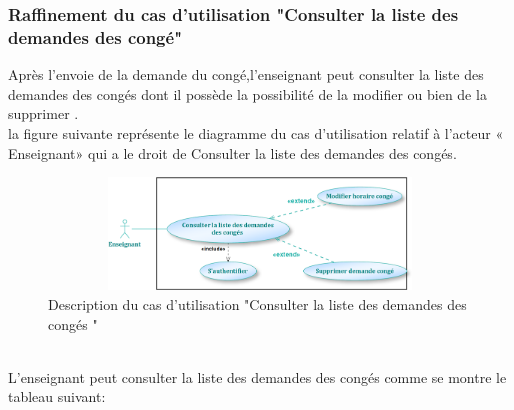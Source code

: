 \documentclass[12 pt ]{report}
\begin{document}
\subsubsection{Raffinement du cas d’utilisation "Consulter la liste des demandes des congé"}
Après l'envoie de la demande du congé,l'enseignant peut consulter la liste des demandes des congés  dont il possède la possibilité de la modifier ou bien de la supprimer  .\\
la figure suivante représente le diagramme du cas d’utilisation  relatif à l’acteur « Enseignant» qui a le droit de Consulter la liste des demandes des congés.
\begin{figure}[h]
\begin{center}
\includegraphics[width= 12cm , height =3cm]{enseignant4.png}
\caption{Description du cas d'utilisation "Consulter la liste des demandes des congés "}
\end{center}
\end{figure}
\\
L'enseignant peut consulter la liste des demandes des congés  comme se montre le tableau suivant:
\end{document}
